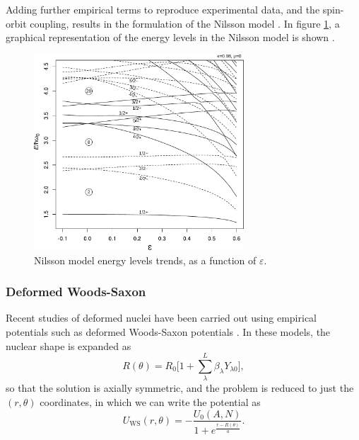 Adding further empirical terms to reproduce experimental data, and the spin-orbit coupling, results in the formulation of the Nilsson model \cite{nilsson}. In figure \ref{fig:nilsson}, a graphical representation of the energy levels in the Nilsson model is shown \cite{wikipedia_equation_of_state}.
\begin{figure}[H]
    \centering
    \includegraphics[width=0.7\textwidth]{Images/nilsson.pdf}
    \caption{Nilsson model energy levels trends, as a function of $\varepsilon$.}
    \label{fig:nilsson}
\end{figure}
\subsubsection{Deformed Woods-Saxon}
Recent studies of deformed nuclei have been carried out using empirical potentials such as deformed Woods-Saxon potentials \cite{def_WS_dudek,defWSfissionbarriers}. In these models, the nuclear shape is expanded as 
\begin{equation}
R(\theta) = R_0\bigg[1+\sum_{\lambda}^L \beta_{\lambda}Y_{\lambda 0}\bigg],
\end{equation}
so that the solution is axially symmetric, and the problem is reduced to just the $(r, \theta)$ coordinates, in which we can write the potential as
\begin{equation}
    \label{eq:def_WS}
    U_\text{WS}(r, \theta) = -\frac{U_0(A, N)}{1+e^\frac{r - R(\theta)}{a}}.
\end{equation}

